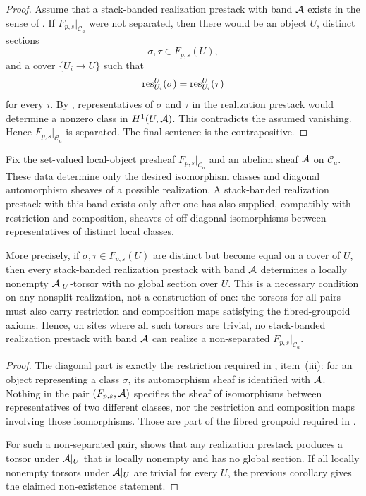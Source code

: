 \begin{proof}
Assume that a stack-banded realization prestack with band $\mathcal{A}$ exists in the
sense of . If $F_{p,s}|_{\mathcal C_a}$ were not separated, then there would be an object $U$, distinct sections
\[
\sigma,\tau\in F_{p,s}(U),
\]
and a cover $\{U_i\to U\}$ such that
\[
\mathrm{res}_{U_i}^{U}(\sigma)=\mathrm{res}_{U_i}^{U}(\tau)
\]
for every $i$. By , representatives of
$\sigma$ and $\tau$ in the realization prestack would determine a nonzero class
in $H^1(U,\mathcal{A})$. This contradicts the assumed vanishing. Hence
$F_{p,s}|_{\mathcal C_a}$ is separated. The final sentence is the contrapositive.
\end{proof}

\begin{proposition}\label{prop:realization-additional-data}
Fix the set-valued local-object presheaf $F_{p,s}|_{\mathcal C_a}$ and an
abelian sheaf $\mathcal{A}$ on $\mathcal C_a$. These data determine only the desired
isomorphism classes and diagonal automorphism sheaves of a possible
realization. A stack-banded realization prestack with this band exists only after one has
also supplied, compatibly with restriction and composition, sheaves of
off-diagonal isomorphisms between representatives of distinct local classes.

More precisely, if $\sigma,\tau\in F_{p,s}(U)$ are distinct but become equal on
a cover of $U$, then every stack-banded realization prestack with band $\mathcal{A}$ determines a
locally nonempty $\mathcal{A}|_U$-torsor with no global section over $U$. This is a
necessary condition on any nonsplit realization, not a construction of one:
the torsors for all pairs must also carry restriction and composition maps
satisfying the fibred-groupoid axioms. Hence, on sites where all such torsors
are trivial, no stack-banded realization prestack with band $\mathcal{A}$ can realize a
non-separated $F_{p,s}|_{\mathcal C_a}$.
\end{proposition}

\begin{proof}
The diagonal part is exactly the restriction required in , item~\textup{(iii)}: for an
object representing a class $\sigma$, its automorphism sheaf is identified
with $\mathcal{A}$. Nothing in the pair $(F_{p,s},\mathcal{A})$ specifies the sheaf of
isomorphisms between representatives of two different classes, nor the
restriction and composition maps involving those isomorphisms. Those are part
of the fibred groupoid required in .

For such a non-separated pair, 
shows that any realization prestack produces a torsor under $\mathcal{A}|_U$ that is
locally nonempty and has no global section. If all locally nonempty torsors
under $\mathcal{A}|_U$ are trivial for every $U$, the previous corollary gives the
claimed non-existence statement.
\end{proof}



